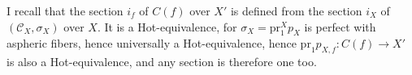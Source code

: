I recall that the section $i_f$ of $C(f)$ over $X'$ is defined from the section $i_X$ of $(\mathcal{C}_X,\sigma_X)$ over $X$. It is a Hot-equivalence, for $\sigma_X = \mathrm{pr}_1^X p_X$ is perfect with aspheric fibers, hence universally a Hot-equivalence, hence $\mathrm{pr}_1 p_{X,f} : C(f) \longrightarrow X'$ is also a Hot-equivalence, and any section is therefore one too.
